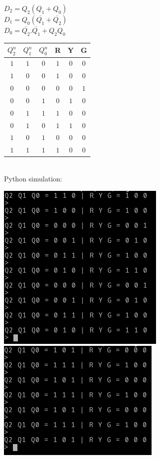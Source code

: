 \documentclass{article}
\begin{document}
\begin{itemize}
	$D_2 = Q_2(Q_1 + Q_0)$\\
	$D_1 = Q_0(\overline{Q_1} + \overline{Q_2})$\\
	$D_0 = \overline{Q_2}.\overline{Q_1} + Q_2Q_0$

	\begin{tabular}{c c c | c c c}
	$Q^n_2$ & $Q^n_1$ & $Q^n_0$ & R & Y & G \\ \hline
	$1$ & $1$ & $0$ & $1$ & $0$ & $0$ \\
	$1$ & $0$ & $0$ & $1$ & $0$ & $0$ \\
	$0$ & $0$ & $0$ & $0$ & $0$ & $1$ \\
	$0$ & $0$ & $1$ & $0$ & $1$ & $0$ \\
	$0$ & $1$ & $1$ & $1$ & $0$ & $0$ \\
	$0$ & $1$ & $0$ & $1$ & $1$ & $0$ \\
	$1$ & $0$ & $1$ & $0$ & $0$ & $0$ \\
	$1$ & $1$ & $1$ & $1$ & $0$ & $0$
	\end{tabular}\\

	Python simulation:

	

	\includegraphics{hw5a}\\
	\includegraphics{hw5b}\\


\end{itemize}
\end{document}
